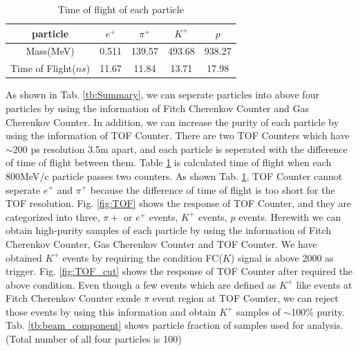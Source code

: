 \begin{table}
  \centering
  \caption{Time of flight of each particle}
  \begin{tabular}[htb]{c|cccc}\hline
    particle & $e^{+}$ & $\pi^{+}$ & $K^{+}$ & $p$ \\ \hline
    Mass(MeV) & 0.511 & 139.57 & 493.68 & 938.27 \\
    Time of Flight($ns$) & 11.67 & 11.84 & 13.71 & 17.98 \\ \hline
  \end{tabular}
  \label{tb:TOF_expect}
\end{table}

As shown in Tab. \ref{tb:Summary}, we can seperate particles into above four particles by using the information of Fitch Cherenkov Counter and Gas Cherenkov Counter.
In addition, we can increase the purity of each particle by using the information of TOF Counter.
There are two TOF Counters which have $\sim$200 ps resolution 3.5m apart, 
and each particle is seperated with the difference of time of flight between them.
Table \ref{tb:TOF_expect} is calculated time of flight when each 800MeV/c particle passes two counters.
As shown Tab. \ref{tb:TOF_expect}, TOF Counter cannot seperate $e^{+}$ and $\pi^{+}$ because the difference of time of flight is too short for the TOF resolution.
Fig. \ref{fig:TOF} shows the response of TOF Counter, and they are categorized into three, $\pi{+}$ or $e^{+}$ events, $K^{+}$ events, $p$ events.
Herewith we can obtain high-purity samples of each particle by using the information of Fitch Cherenkov Counter, Gas Cherenkov Counter and TOF Counter.
We have obtained $K^{+}$ events by requiring the condition FC($K$) signal is above 2000 as trigger.
Fig. \ref{fig:TOF_cut} shows the response of TOF Counter after required the above condition.
Even though a few events which are defined as $K^{+}$ like events at Fitch Cherenkov Counter exude $\pi$ event region at TOF Counter,
we can reject those events by using this information and obtain $K^{+}$ samples of $\sim$100$\%$ purity.
Tab. \ref{tb:beam_component} shows particle fraction of samples used for analysis.(Total number of all four particles is 100)\\

